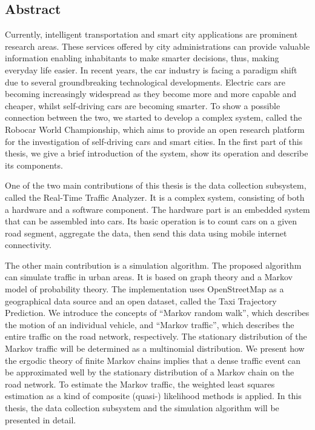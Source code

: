\documentclass[b5paper,12pt]{report}
\theoremstyle{definition}
\begin{document}
\subsection*{Abstract}
\begin{small}
\begin{minipage}{.9\linewidth}
\singlespace

Currently, intelligent transportation and smart city applications are prominent research areas. These services offered by city administrations can provide valuable information enabling inhabitants to make smarter decisions, thus, making everyday life easier. In recent years, the car industry is facing a paradigm shift due to several groundbreaking technological developments. Electric cars are becoming increasingly widespread as they become more and more capable and cheaper, whilst self-driving cars are becoming smarter. To show a possible connection between the two, we started to develop a complex system, called the Robocar World Championship, which aims to provide an open research platform for the investigation of self-driving cars and smart cities. In the first part of this thesis, we give a brief introduction of the system, show its operation and describe its components. 

One of the two main contributions of this thesis is the data collection subsystem, called the Real-Time Traffic Analyzer. It is a complex system, consisting of both a hardware and a software component. The hardware part is an embedded system that can be assembled into cars. Its basic operation is to count cars on a given road segment, aggregate the data, then send this data using mobile internet connectivity.

The other main contribution is a simulation algorithm. The proposed algorithm can simulate traffic in urban areas. It is based on graph theory and a Markov model of probability theory. The implementation uses OpenStreetMap as a geographical data source and an open dataset, called the Taxi Trajectory Prediction. We introduce the concepts of \enquote{Markov random walk}, which describes the motion of an individual vehicle, and \enquote{Markov traffic}, which describes the entire traffic on the road network, respectively. The stationary distribution of the Markov traffic will be determined as a multinomial distribution. We present how the ergodic theory of finite Markov chains implies that a dense traffic event can be approximated well by the stationary distribution of a Markov chain on the road network. To estimate the Markov traffic, the weighted least squares estimation as a kind of composite (quasi-) likelihood methods is applied. In this thesis, the data collection subsystem and the simulation algorithm will be presented in detail.

\end{minipage}
\end{small}
\end{document}
